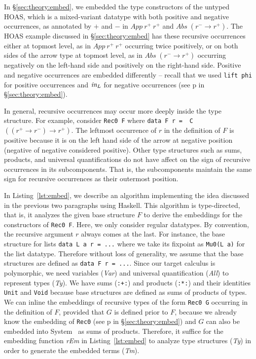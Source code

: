In \S\ref{sec:theory:embed}, we embedded the type constructors of
the untyped HOAS, which is a mixed-variant datatype with both positive
and negative occurrences, as annotated by $+$ and $-$
in $\textit{App}~r^{+}~r^{+}$ and $\textit{Abs}\;(r^{-} \to r^{+})$.
The HOAS example discussed in \S\ref{sec:theory:embed} has these
recursive occurrences either at topmost level, as in $\textit{App}~r^{+}~r^{+}$
occurring twice positively, or on both sides of the arrow type at topmost level,
as in $\textit{Abs}\;(r^{-} \to r^{+})$ occurring negatively
on the left-hand side and positively on the right-hand side.
Positive and negative occurrences are embedded differently --
recall that we used \lstinline{lift phi} for positive occurrences and $\textit{in}_{L}$ for
negative occurrences (see p\pageref{align:embed} in \S\ref{sec:theory:embed}).

In general, recursive occurrences may occur more deeply inside
the type structure. For example, consider \lstinline{Rec0 F} where
\lstinline{data F r =  C}~$((r^{+} \to r^{-}) \to r^{+})$.
The leftmost occurrence of $r$ in the definition of $F$ is positive
because it is on the left hand side of the arrow at negative position
(negative of negative considered positive). Other type structures such as sums,
products, and universal quantifications do not have affect on the sign of
recursive occurrences in its subcomponents. That is, the subcomponents
maintain the same sign for recursive occurrences as their outermost position.

In Listing~\ref{lst:embed}, we describe an algorithm implementing the idea
discussed in the previous two paragraphs using Haskell. This algorithm is
type-directed, that is, it analyzes the given base structure $F$ to derive
the embeddings for the constructors of \lstinline{Rec0 F}. Here, we only
consider regular datatypes. By convention, the recursive argument $r$ always
comes at the last. For instance, the base structure for lists
\lstinline{data L a r = ...} where we take its fixpoint as \lstinline{Mu0(L a)}
for the list datatype. Therefore without loss of generality, we assume
that the base structures are defined as \lstinline{data F r = ...}.
Since our target calculus is polymorphic, we need variables (\textit{Var})
and universal quantification (\textit{All}) to represent types (\textit{Ty}).
We have sums (\lstinline{:+:}) and products (\lstinline{:*:}) and their
identities \lstinline{Unit} and \lstinline{Void} because base structures are
defined as sums of products of types. We can inline the embeddings of recursive
types of the form \lstinline{Rec0 G} occurring in the definition of $F$,
provided that $G$ is defined prior to $F$, because we already know
the embedding of \lstinline{Rec0} (see p\pageref{sec:theory:embed} in
\S\ref{sec:theory:embed}) and $G$ can also be embedded into System \Fw\ as
sums of products. Therefore, it suffice for the embedding function \textit{rEm}
in Listing~\ref{lst:embed} to analyze type structures (\textit{Ty})
in order to generate the embedded terms (\textit{Tm}).


